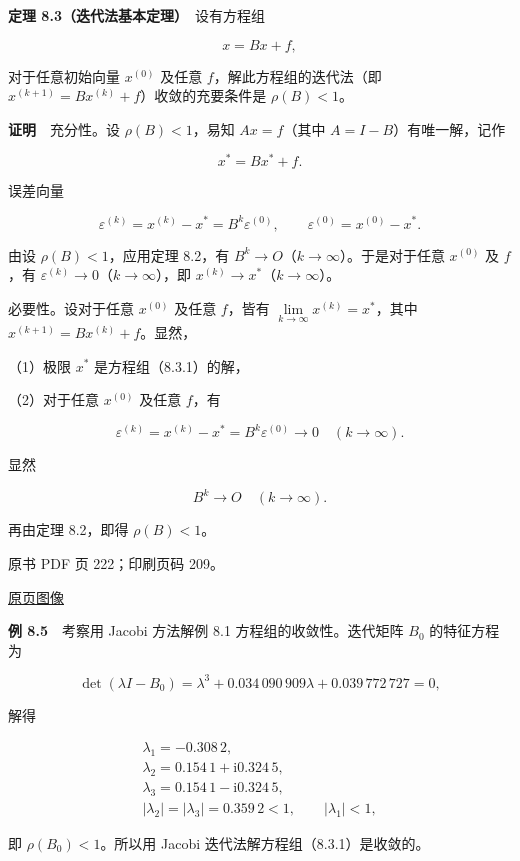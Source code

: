\textbf{定理 8.3（迭代法基本定理）}　设有方程组

\[
x=Bx+f,
\tag{8.3.1}
\]

对于任意初始向量 \(x^{(0)}\) 及任意 \(f\)，解此方程组的迭代法（即 \(x^{(k+1)}=Bx^{(k)}+f\)）收敛的充要条件是 \(\rho(B)<1\)。

\textbf{证明}　充分性。设 \(\rho(B)<1\)，易知 \(Ax=f\)（其中 \(A=I-B\)）有唯一解，记作

\[
x^*=Bx^*+f.
\tag{8.3.2}
\]

误差向量

\[
\varepsilon^{(k)}=x^{(k)}-x^*=B^k\varepsilon^{(0)},\qquad\varepsilon^{(0)}=x^{(0)}-x^*.
\]

由设 \(\rho(B)<1\)，应用定理 8.2，有 \(B^k\to O\)（\(k\to\infty\)）。于是对于任意 \(x^{(0)}\) 及 \(f\)，有 \(\varepsilon^{(k)}\to0\)（\(k\to\infty\)），即 \(x^{(k)}\to x^*\)（\(k\to\infty\)）。

必要性。设对于任意 \(x^{(0)}\) 及任意 \(f\)，皆有 \(\lim\limits_{k\to\infty}x^{(k)}=x^*\)，其中 \(x^{(k+1)}=Bx^{(k)}+f\)。显然，

（1）极限 \(x^*\) 是方程组（8.3.1）的解，

（2）对于任意 \(x^{(0)}\) 及任意 \(f\)，有

\[
\varepsilon^{(k)}=x^{(k)}-x^*=B^k\varepsilon^{(0)}\to0\quad(k\to\infty).
\]

显然

\[
B^k\to O\quad(k\to\infty).
\]

再由定理 8.2，即得 \(\rho(B)<1\)。

\clearpage

原书 PDF 页 222；印刷页码 209。

\href{source-images/pdf-222.jpeg}{原页图像}

\textbf{例 8.5}　考察用 Jacobi 方法解例 8.1 方程组的收敛性。迭代矩阵 \(B_0\) 的特征方程为

\[
\det(\lambda I-B_0)=\lambda^3+0.034\,090\,909\lambda+0.039\,772\,727=0,
\]

解得

\[
\begin{gathered}
\lambda_1=-0.308\,2,\\
\lambda_2=0.154\,1+\mathrm i0.324\,5,\\
\lambda_3=0.154\,1-\mathrm i0.324\,5,\\
|\lambda_2|=|\lambda_3|=0.359\,2<1,\qquad|\lambda_1|<1,
\end{gathered}
\]

即 \(\rho(B_0)<1\)。所以用 Jacobi 迭代法解方程组（8.3.1）是收敛的。

